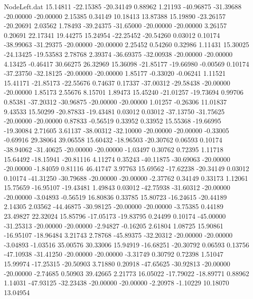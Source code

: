 \begin{filecontents}{NodeLeft.dat}
  15.14811  -22.15385  -20.34149     0.88962    1.21193  -40.96875  -31.39688  -20.00000  -20.00000    2.15385    0.34149   10.18413   13.87388
  15.19890  -23.26157  -20.20691     2.03562    1.78493  -39.24375  -31.65000  -20.00000  -20.00000    3.26157    0.20691   22.17341   19.44275
  15.24954  -22.25452  -20.54260     0.03012    0.10174  -38.99063  -31.29375  -20.00000  -20.00000    2.25452    0.54260    0.32986    1.11431
  15.30025  -24.13425  -19.53583     2.78768    2.39374  -36.69375  -32.00938  -20.00000  -20.00000    4.13425   -0.46417   30.66275   26.32969
  15.36098  -21.85177  -19.66980    -0.00569    0.10174  -37.23750  -32.18125  -20.00000  -20.00000    1.85177   -0.33020   -0.06241    1.11521
  15.41171  -21.85173  -22.55676     0.74637    0.17337  -37.00312  -29.58438  -20.00000  -20.00000    1.85173    2.55676    8.15701    1.89473
  15.45240  -21.01257  -19.73694     0.99706    0.85381  -37.20312  -30.96875  -20.00000  -20.00000    1.01257   -0.26306   11.01837    9.43533
  15.50299  -20.87833  -19.43481     0.03012    0.03012  -37.13750  -31.75625  -20.00000  -20.00000    0.87833   -0.56519    0.33952    0.33952
  15.55368  -19.66995  -19.30084     2.71605    3.61137  -38.00312  -32.10000  -20.00000  -20.00000   -0.33005   -0.69916   29.38064   39.06558
  15.60432  -18.96503  -20.30762     0.06593    0.10174  -38.94062  -31.40625  -20.00000  -20.00000   -1.03497    0.30762    0.72395    1.11718
  15.64492  -18.15941  -20.81116     4.11274    0.35243  -40.11875  -30.69063  -20.00000  -20.00000   -1.84059    0.81116   46.41747    3.97763
  15.69562  -17.62238  -20.34149     0.03012    0.10174  -41.31250  -30.79688  -20.00000  -20.00000   -2.37762    0.34149    0.33173    1.12061
  15.75659  -16.95107  -19.43481     1.49843    0.03012  -42.75938  -31.60312  -20.00000  -20.00000   -3.04893   -0.56519   16.80836    0.33785
  15.80723  -16.24615  -20.44189     2.14305    2.03562  -44.46875  -30.98125  -20.00000  -20.00000   -3.75385    0.44189   23.49827   22.32024
  15.85796  -17.05173  -19.83795     0.24499    0.10174  -45.00000  -31.25313  -20.00000  -20.00000   -2.94827   -0.16205    2.61804    1.08725
  15.90861  -16.95107  -18.96484     3.21743    2.78768  -45.89375  -32.20312  -20.00000  -20.00000   -3.04893   -1.03516   35.00576   30.33006
  15.94919  -16.68251  -20.30792     0.06593    0.13756  -47.10938  -31.41250  -20.00000  -20.00000   -3.31749    0.30792    0.72398    1.51047
  15.99974  -17.25315  -20.50903     3.71880    0.20918  -47.65625  -30.92813  -20.00000  -20.00000   -2.74685    0.50903   39.42665    2.21773
  16.05022  -17.79022  -18.89771     0.88962    1.14031  -47.93125  -32.23438  -20.00000  -20.00000   -2.20978   -1.10229   10.18070   13.04954

\end{filecontents}
